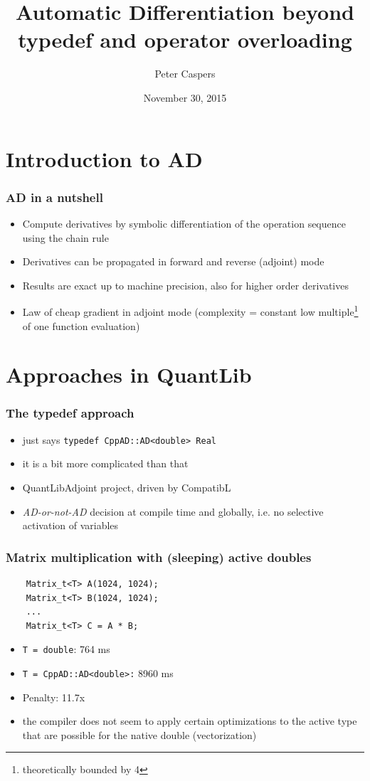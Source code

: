 \documentclass{beamer}
\begin{document}
\title{Automatic Differentiation beyond typedef and operator overloading}
\author{Peter Caspers}
\date{November 30, 2015}

\frame{\titlepage}


\section{Introduction to AD}

\begin{frame}[fragile]
\frametitle{AD in a nutshell}
\begin{itemize}
\item Compute derivatives by symbolic differentiation of the operation sequence using the chain rule
\item Derivatives can be propagated in forward and reverse (adjoint) mode
\item Results are exact up to machine precision, also for higher order derivatives
\item Law of cheap gradient in adjoint mode (complexity = constant low multiple\footnote{theoretically bounded by 4} of one function evaluation)
\end{itemize}
\end{frame}

\section{Approaches in QuantLib}

\begin{frame}[fragile]
\frametitle{The typedef approach}
\begin{itemize}
\item just says \verb+typedef CppAD::AD<double> Real+
\item it is a bit more complicated than that
\item QuantLibAdjoint project, driven by CompatibL
\item \textit{AD-or-not-AD} decision at compile time and globally, i.e. no selective activation of variables
\end{itemize}
\end{frame}

\begin{frame}[fragile]
\frametitle{Matrix multiplication with (sleeping) active doubles}
\begin{verbatim}
    Matrix_t<T> A(1024, 1024);
    Matrix_t<T> B(1024, 1024);
    ...
    Matrix_t<T> C = A * B;
\end{verbatim}
\begin{itemize}
\item \verb+T = double+: 764 ms
\item \verb+T = CppAD::AD<double>:+ 8960 ms
\item Penalty: 11.7x
\item the compiler does not seem to apply certain optimizations to the active type that are possible for the native double (vectorization)
\end{itemize}
\end{frame}
\end{document}
